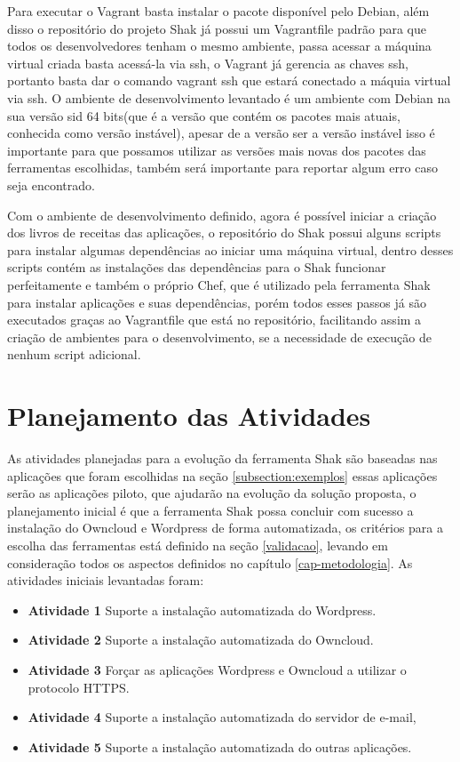 Para executar o Vagrant basta instalar o pacote disponível pelo Debian, além disso
o repositório do projeto Shak já possui um Vagrantfile padrão para que todos os
desenvolvedores tenham o mesmo ambiente, passa acessar a máquina virtual criada
basta acessá-la via ssh, o Vagrant já gerencia as chaves ssh, portanto basta
dar o comando vagrant ssh que estará conectado a máquia virtual via ssh.
O ambiente de desenvolvimento levantado é um ambiente com Debian na sua versão
sid 64 bits(que é a versão que contém os pacotes mais atuais, conhecida como versão instável),
apesar de a versão ser a versão instável isso é importante para que possamos
utilizar as versões mais novas dos pacotes das ferramentas escolhidas, também
será importante para reportar algum erro caso seja encontrado.

Com o ambiente de desenvolvimento definido, agora é possível iniciar a criação dos
livros de receitas das aplicações, o repositório do Shak possui alguns scripts
para instalar algumas dependências ao iniciar uma máquina virtual, dentro
desses scripts contém as instalações das dependências para o Shak funcionar perfeitamente
e também o próprio Chef, que é utilizado pela ferramenta Shak para instalar aplicações
e suas dependências, porém todos esses passos já são executados graças ao Vagrantfile
que está no repositório, facilitando assim a criação de ambientes para o desenvolvimento,
se a necessidade de execução de nenhum script adicional.


\section{Planejamento das Atividades}

As atividades planejadas para a evolução da ferramenta Shak são baseadas nas aplicações que foram escolhidas na seção
\ref{subsection:exemplos} essas aplicações serão as aplicações piloto, que ajudarão na evolução
da solução proposta, o planejamento inicial é que a ferramenta Shak possa concluir com sucesso
a instalação do Owncloud e Wordpress de forma automatizada, os critérios
para a escolha das ferramentas está definido na seção \ref{validacao},
levando em consideração todos os aspectos definidos no capítulo
\ref{cap-metodologia}. As atividades iniciais levantadas foram:

 \begin{itemize}
   \item \textbf{Atividade 1} Suporte a instalação automatizada do Wordpress.
   \item \textbf{Atividade 2} Suporte a instalação automatizada do Owncloud.
   \item \textbf{Atividade 3} Forçar as aplicações Wordpress e Owncloud a
   utilizar o protocolo HTTPS.
   \item \textbf{Atividade 4} Suporte a instalação automatizada do servidor de e-mail,
   \item \textbf{Atividade 5} Suporte a instalação automatizada do outras aplicações.
 \end{itemize}

